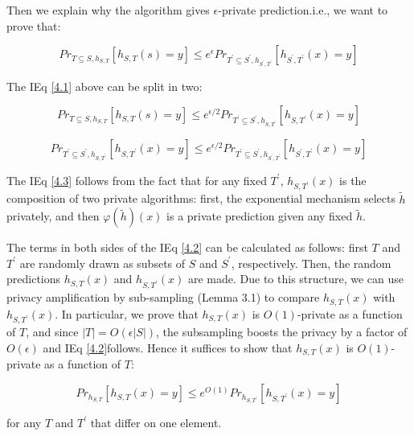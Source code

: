 \documentclass[a4paper,9pt]{scrartcl}
\begin{document}
Then we explain why the algorithm gives $\epsilon$-private prediction.i.e., we want to prove that:

\begin{equation}
    Pr_{T \subseteq S, h_{S, T}}[h_{S, T}(s) = y] \le e^{\epsilon} Pr_{T^\prime \subseteq S^\prime, h_{S^\prime, T^\prime}}[h_{S^\prime, T^\prime}(x) = y] \label{4.1}
\end{equation}

The IEq \ref{4.1} above can be split in two:

\begin{equation}
    Pr_{T \subseteq S, h_{S, T}}[h_{S, T}(s) = y] \le e^{\epsilon / 2} Pr_{T^\prime \subseteq S^\prime, h_{S, T^\prime}}[h_{S, T^\prime}(x) = y] \label{4.2}
\end{equation}

\begin{equation}
    Pr_{T^\prime \subseteq S^\prime, h_{S, T^\prime}}[h_{S, T^\prime}(x) = y] \le e^{\epsilon / 2} Pr_{T^\prime \subseteq S^\prime, h_{S^\prime, T^\prime}}[h_{S^\prime, T^\prime}(x) = y] \label{4.3}
\end{equation}

The IEq \ref{4.3} follows from the fact that for any fixed $T^\prime$, $h_{S, T^\prime}(x)$ is the composition of two private algorithms: first, the exponential mechanism selects $\tilde h$ privately, and then $\varphi (\tilde h)(x)$ is a private prediction given any fixed $\tilde h$.

The terms in both sides of the IEq \ref{4.2} can be calculated as follows: first $T$ and $T^\prime$ are randomly drawn as subsets of $S$ and $S^\prime$, respectively. Then, the random predictions $h_{S, T}(x)$ and $h_{S, T^\prime}(x)$ are made. Due to this structure, we can use privacy amplification by sub-sampling (Lemma 3.1) to compare $h_{S,T}(x)$ with $h_{S, T^\prime}(x)$. In particular, we prove that $h_{S, T}(x)$ is $O(1)$-private as a function of $T$, and since $|T| = O(\epsilon |S|)$, the subsampling boosts the privacy by a factor of $O(\epsilon)$ and IEq \ref{4.2}follows. Hence it suffices to show that $h_{S, T}(x)$ is $O(1)$-private as a function of $T$:

\begin{equation}
    Pr_{h_{S, T}}[h_{S, T}(x) = y] \le e^{O(1)} Pr_{h_{S, T^\prime}}[h_{S, T^\prime}(x) = y] \label{4.4}
\end{equation}

for any $T$ and $T^\prime$ that differ on one element.
\end{document}
